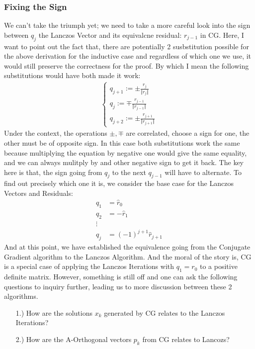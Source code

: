 \documentclass[]{article}
\theoremstyle{definition}
\begin{document}
        \subsubsection{Fixing the Sign}
            We can't take the triumph yet; we need to take a more careful look into the sign between $q_j$ the Lanczos Vector and its equivalcne residual: $r_{j - 1}$ in CG. Here, I want to point out the fact that, there are potentially 2 susbstitution possible for the above derivation for the inductive case and regardless of which one we use, it would still preserve the correctness for the proof. By which I mean the following substitutions would have both made it work: 
            \begin{align}
                \begin{cases}
                    q_{j + 1} := \pm \frac{r_j}{\Vert r_j\Vert}
                    \\
                    q_{j} := \mp \frac{r_{j - 1}}{\Vert r_{j - 1}\Vert}
                    \\
                    q_{j + 2} := \pm \frac{r_{j + 1}}{\Vert r_{j + 1}\Vert}
                \end{cases}
            \end{align}
            Under the context, the operations $\pm, \mp$ are correlated, choose a sign for one, the other must be of opposite sign. In this case both substitutions work the same because multiplying the equation by negative one would give the same equality, and we can always mulitply by and other negative sign to get it back. The key here is that, the sign going from $q_{j}$ to the next $q_{j - 1}$ will have to alternate. To find out precisely which one it is, we consider the base case for the Lanczos Vectors and Residuals: 
            \begin{align}
                q_1 &= \hat r_0\\
                q_2 &= -\hat r_1
                \\
                \vdots
                \\
                q_j &= (-1)^{j + 1}\hat r_{j + 1}
            \end{align}
            And at this point, we have established the equivalence going from the Conjugate Gradient algorithm to the Lanczos Algorithm. And the moral of the story is, CG is a special case of applying the Lanczos Iterations with $q_1 = r_0$ to a positive definite matrix. However, something is still off and one can ask the following questions to inquiry further, leading us to more discussion between these 2 algorithms. 
            \begin{enumerate}
                \item [1.)] How are the solutions $x_k$ generated by CG relates to the Lanczos Iterations? 
                \item [2.)] How are the A-Orthogonal vectors $p_k$ from CG relates to Lancozs? 
            \end{enumerate}
\end{document}
